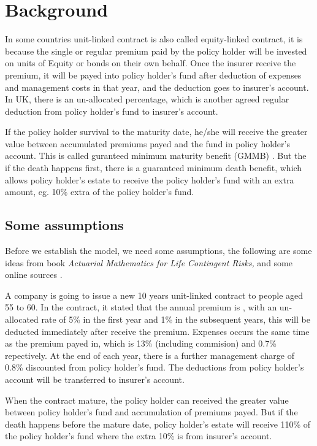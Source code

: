 \documentclass{report}
\begin{document}
\section{Background}

In some countries unit-linked contract is also called equity-linked contract, it is because the single or regular premium paid by the policy holder will be invested on units of Equity or bonds on their own behalf. Once the insurer receive the premium, it will be payed into policy holder's fund after deduction of expenses and management costs in that year, and the deduction goes to insurer's account. In UK, there is an un-allocated percentage, which is another agreed regular deduction from policy holder's fund to insurer's account.

If the policy holder survival to the maturity date, he/she will receive the greater value between accumulated premiums payed and the fund in policy holder's account. This is called guranteed minimum maturity benefit (GMMB) \cite{bib:GMMB}. But the if the death happens first, there is a guaranteed minimum death benefit, which allows policy holder's estate to receive the policy holder's fund with an extra amount, eg. 10\% extra of the policy holder's fund. 


\subsection{Some assumptions}  \label{unit-link-basic-assumptions}

Before we establish the model, we need some assumptions, the following are some ideas from  \cite{bib:unitlinkeg} book {\em Actuarial Mathematics for Life Contingent Risks,} and some online sources \cite{bib:unitlinkedonline}. 


A company is going to issue a new 10 years unit-linked contract to people aged 55 to 60. In the contract, it stated that the annual premium is , with an un-allocated rate of 5\% in the first year and 1\% in the subsequent years, this will be deducted immediately after receive the premium. Expenses occurs the same time as the premium payed in, which is 13\% (including commision) and 0.7\% repectively. At the end of each year, there is a further management charge of 0.8\%  discounted from policy holder's fund. The deductions from policy holder's account will be transferred to insurer's account.

When the contract mature, the policy holder can received the greater value between policy holder's fund and accumulation of premiums payed. But if the death happens before the mature date, policy holder's estate will receive 110\% of the policy holder's fund where the extra 10\% is from insurer's account.
\end{document}
